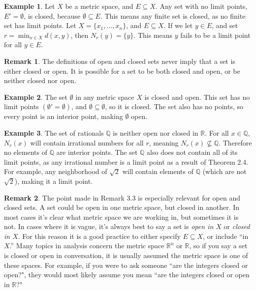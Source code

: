 \documentclass{article}
\newcommand{\R}{\mathbb{R}}
\newcommand{\Q}{\mathbb{Q}}
\theoremstyle{definition}
\newtheorem{example}{Example}[section]
\newtheorem{remark}{Remark}[section]
\begin{document}
\begin{example}
Let $ X $ be a metric space, and $ E\subseteq X $. Any set with no limit points, $ E'=\emptyset $, is closed, because $ \emptyset\subseteq E $. This means any finite set is closed, as no finite set has limit points. Let $ X=\{x_1,\ldots, x_n\} $, and $ E\subseteq X $. If we let $ y\in E $, and set $ r=\min_{x\in X}d(x,y) $, then $ N_r(y)=\{y\} $. This means $ y $ fails to be a limit point for all $ y\in E $.
\end{example}
\begin{remark}
	The definitions of open and closed sets never imply that a set is either closed or open. It is possible for a set to be both closed and open, or be neither closed nor open.
\end{remark}
\begin{example}
The set $ \emptyset $ in any metric space $ X $ is closed and open. This set has no limit points $ (\emptyset'=\emptyset) $, and $ \emptyset\subseteq\emptyset $, so it is closed. The set also has no points, so every point is an interior point, making $ \emptyset $ open. 
\end{example}
\begin{example}
The set of rationals $ \Q $ is neither open nor closed in $ \R $. For all $ x\in\Q $, $ N_r(x) $ will contain irrational numbers for all $ r $, meaning $ N_r(x)\not\subseteq\Q $. Therefore no elements of $ \Q $ are interior points. The set $ \Q $ also does not contain all of its limit points, as any irrational number is a limit point as a result of Theorem 2.4. For example, any neighborhood of $ \sqrt{2} $ will contain elements of $ \Q $ (which are not $ \sqrt{2} $), making it a limit point. 
\end{example}
\begin{remark}
	The point made in Remark 3.3 is especially relevant for open and closed sets. A set could be open in one metric space, but closed in another. In most cases it's clear what metric space we are working in, but sometimes it is not. In cases where it is vague, it's always best to say a set is \textit{open in $ X $} or \textit{closed in $ X $}. For this reason it is a good practice to either specify $ E\subseteq X $, or include ``in $ X $.'' Many topics in analysis concern the metric space $ \R^n $ or $ \R $, so if you say a set is closed or open in conversation, it is usually assumed the metric space is one of these spaces. For example, if you were to ask someone ``are the integers closed or open?", they would most likely assume you mean ``are the integers closed or open in $ \R $?" 
\end{remark}
\end{document}
